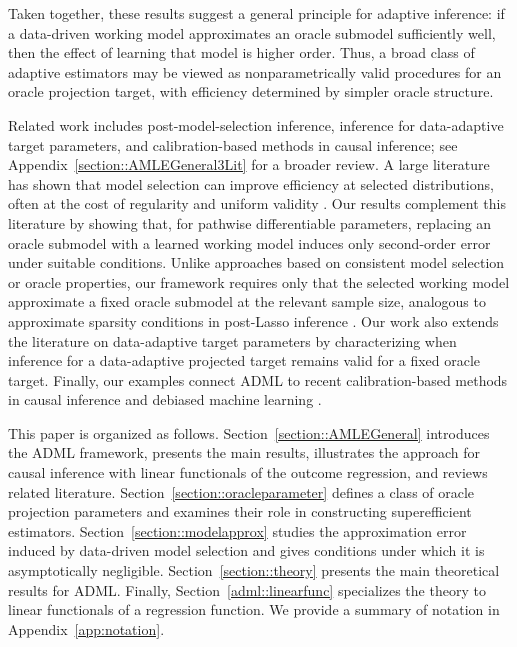 \documentclass[11pt]{article}
\theoremstyle{definition}
\begin{document}
Taken together, these results suggest a general principle for adaptive inference: if a data-driven working model approximates an oracle submodel sufficiently well, then the effect of learning that model is higher order. Thus, a broad class of adaptive estimators may be viewed as nonparametrically valid procedures for an oracle projection target, with efficiency determined by simpler oracle structure.

Related work includes post-model-selection inference, inference for data-adaptive target parameters, and calibration-based methods in causal inference; see Appendix~\ref{section::AMLEGeneral3Lit} for a broader review. A large literature has shown that model selection can improve efficiency at selected distributions, often at the cost of regularity and uniform validity \citep{LeebModelSelect2005, claeskens2007asymptotic, wu2019hodges, moosavi2023costs}. Our results complement this literature by showing that, for pathwise differentiable parameters, replacing an oracle submodel with a learned working model induces only second-order error under suitable conditions. Unlike approaches based on consistent model selection or oracle properties, our framework requires only that the selected working model approximate a fixed oracle submodel at the relevant sample size, analogous to approximate sparsity conditions in post-Lasso inference \citep{belloni2012sparse, belloni2014inference}. Our work also extends the literature on data-adaptive target parameters \citep{van2013AdaptTarget, rinaldo2019bootstrapping} by characterizing when inference for a data-adaptive projected target remains valid for a fixed oracle target. Finally, our examples connect ADML to recent calibration-based methods in causal inference and debiased machine learning \citep{van2024automatic, van2024stabilized}.

 
This paper is organized as follows. Section~\ref{section::AMLEGeneral} introduces the ADML framework, presents the main results, illustrates the approach for causal inference with linear functionals of the outcome regression, and reviews related literature. Section~\ref{section::oracleparameter} defines a class of oracle projection parameters and examines their role in constructing superefficient estimators. Section~\ref{section::modelapprox} studies the approximation error induced by data-driven model selection and gives conditions under which it is asymptotically negligible. Section~\ref{section::theory} presents the main theoretical results for ADML. Finally, Section~\ref{adml::linearfunc} specializes the theory to linear functionals of a regression function. We provide a summary of notation in Appendix~\ref{app:notation}.
\end{document}
